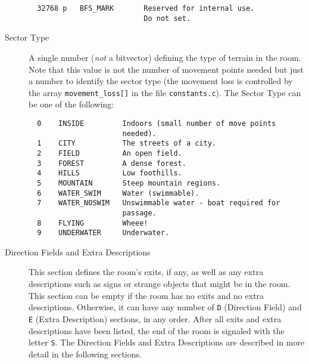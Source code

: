 \documentclass[11pt]{article}
\begin{document}
\begin{description}
\begin{verbatim}
  32768 p   BFS_MARK       Reserved for internal use.
                           Do not set.
\end{verbatim}
\item[Sector Type] A single number ({\em not} a bitvector) defining the type of terrain in the room.  Note that this value is not the number of movement points needed but just a number to identify the sector type (the movement loss is controlled by the array \texttt{movement\_loss[]} in the file \texttt{constants.c}). The Sector Type can be one of the following:
\begin{verbatim}
  0    INSIDE         Indoors (small number of move points
                      needed).
  1    CITY           The streets of a city.
  2    FIELD          An open field.
  3    FOREST         A dense forest.
  4    HILLS          Low foothills.
  5    MOUNTAIN       Steep mountain regions.
  6    WATER_SWIM     Water (swimmable).
  7    WATER_NOSWIM   Unswimmable water - boat required for
                      passage.
  8    FLYING         Wheee!
  9    UNDERWATER     Underwater.
\end{verbatim}
\item[Direction Fields and Extra Descriptions] This section defines the room's exits, if any, as well as any extra descriptions such as signs or strange objects that might be in the room.  This section can be empty if the room has no exits and no extra descriptions.  Otherwise, it can have any number of \texttt{D} (Direction Field) and \texttt{E} (Extra Description) sections, in any order.  After all exits and extra descriptions have been listed, the end of the room is signaled with the letter \texttt{S}.  The Direction Fields and Extra Descriptions are described in more detail in the following sections.
\end{description}
\end{document}
